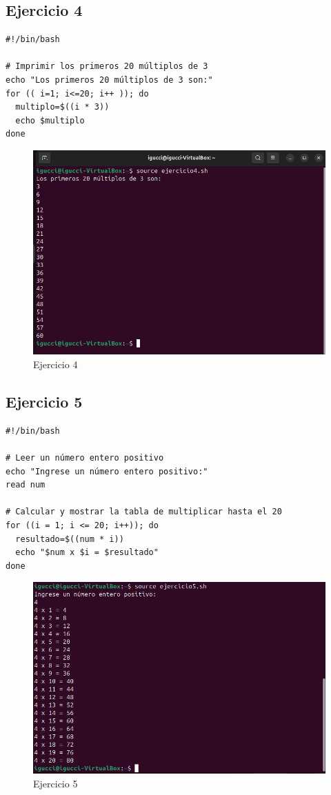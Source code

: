 \documentclass[11pt,twoside]{book}
\begin{document}
\subsection{Ejercicio 4}
\begin{lstlisting}
#!/bin/bash

# Imprimir los primeros 20 múltiplos de 3
echo "Los primeros 20 múltiplos de 3 son:"
for (( i=1; i<=20; i++ )); do
  multiplo=$((i * 3))
  echo $multiplo
done

\end{lstlisting}
\begin{figure}
    \centering
    \includegraphics[width=0.5\linewidth]{Ej4.png}
    \caption{Ejercicio 4}

\end{figure}

\subsection{Ejercicio 5}
\begin{lstlisting}
#!/bin/bash

# Leer un número entero positivo
echo "Ingrese un número entero positivo:"
read num

# Calcular y mostrar la tabla de multiplicar hasta el 20
for ((i = 1; i <= 20; i++)); do
  resultado=$((num * i))
  echo "$num x $i = $resultado"
done
\end{lstlisting}

\begin{figure}
    \centering
    \includegraphics[width=0.5\linewidth]{Ej5.png}
    \caption{Ejercicio 5}

\end{figure}
\end{document}
